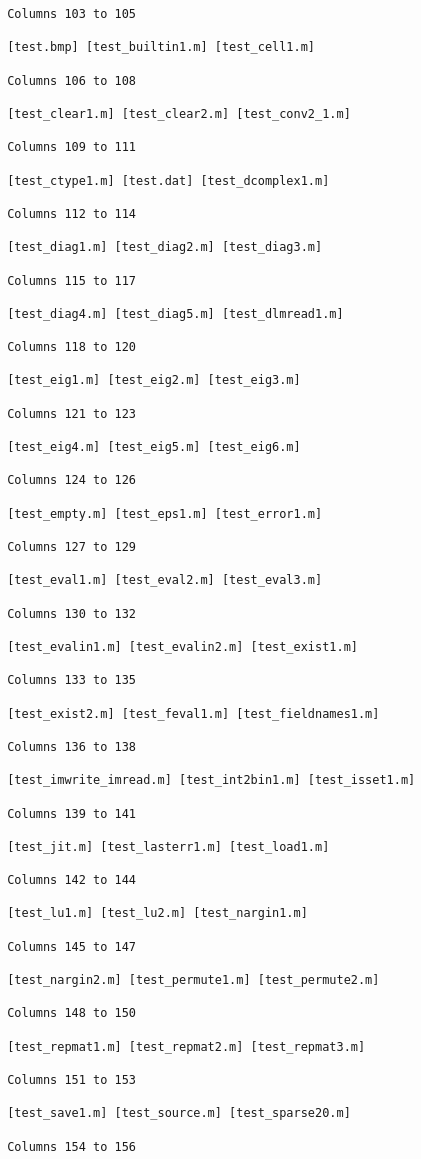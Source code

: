 \begin{verbatim}
 Columns 103 to 105

 [test.bmp] [test_builtin1.m] [test_cell1.m] 

 Columns 106 to 108

 [test_clear1.m] [test_clear2.m] [test_conv2_1.m] 

 Columns 109 to 111

 [test_ctype1.m] [test.dat] [test_dcomplex1.m] 

 Columns 112 to 114

 [test_diag1.m] [test_diag2.m] [test_diag3.m] 

 Columns 115 to 117

 [test_diag4.m] [test_diag5.m] [test_dlmread1.m] 

 Columns 118 to 120

 [test_eig1.m] [test_eig2.m] [test_eig3.m] 

 Columns 121 to 123

 [test_eig4.m] [test_eig5.m] [test_eig6.m] 

 Columns 124 to 126

 [test_empty.m] [test_eps1.m] [test_error1.m] 

 Columns 127 to 129

 [test_eval1.m] [test_eval2.m] [test_eval3.m] 

 Columns 130 to 132

 [test_evalin1.m] [test_evalin2.m] [test_exist1.m] 

 Columns 133 to 135

 [test_exist2.m] [test_feval1.m] [test_fieldnames1.m] 

 Columns 136 to 138

 [test_imwrite_imread.m] [test_int2bin1.m] [test_isset1.m] 

 Columns 139 to 141

 [test_jit.m] [test_lasterr1.m] [test_load1.m] 

 Columns 142 to 144

 [test_lu1.m] [test_lu2.m] [test_nargin1.m] 

 Columns 145 to 147

 [test_nargin2.m] [test_permute1.m] [test_permute2.m] 

 Columns 148 to 150

 [test_repmat1.m] [test_repmat2.m] [test_repmat3.m] 

 Columns 151 to 153

 [test_save1.m] [test_source.m] [test_sparse20.m] 

 Columns 154 to 156


\end{verbatim}
